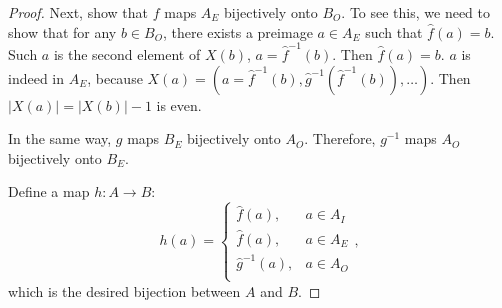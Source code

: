 \begin{proof}
    Next, show that $f$ maps $A_E$ bijectively onto $B_O$. To see this, we need to show that for any $b \in B_O$, there exists a preimage $a \in A_E$ such that $\widehat{f}(a) = b$. Such $a$ is the second element of $X(b)$, $a = \widehat{f}^{-1}(b)$. Then $\widehat{f}(a) = b$. $a$ is indeed in $A_E$, because $X(a) = (a = \widehat{f}^{-1}(b), \widehat{g}^{-1}(\widehat{f}^{-1}(b)), \ldots)$. Then $|X(a)| = |X(b)| - 1$ is even.

    In the same way, $g$ maps $B_E$ bijectively onto $A_O$. Therefore, $g^{-1}$ maps $A_O$ bijectively onto $B_E$.

    Define a map $h : A \to B$:
    \begin{equation}
        h(a) = 
        \begin{cases}
            \widehat{f}(a), & a \in A_I \\
            \widehat{f}(a), & a \in A_E \\
            \widehat{g}^{-1}(a), & a \in A_O \\
        \end{cases},
    \end{equation}
    which is the desired bijection between $A$ and $B$.
\end{proof}
